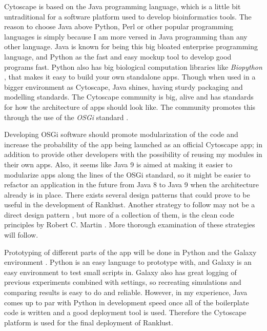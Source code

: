 \documentclass[UKenglish]{ifimaster}
\begin{document}
Cytoscape is based on the Java programming language, which is a little bit untraditional for a software platform used to
develop bioinformatics tools. %
The reason to choose Java above Python, Perl or other popular programming languages is simply because I am more
versed in Java programming than any other language. Java is known for being this big bloated 
enterprise programming language, and Python as the fast and easy mockup tool to develop good programs fast. Python also
has big biological computation libraries like \emph{Biopython} \cite{biopython}, that makes it easy to build your own
standalone apps. Though when used in a bigger environment as Cytoscape, Java shines, having sturdy packaging and
modelling standards. The Cytoscape community is big, alive and has standards for how the architecture of apps should
look like. The community promotes this through the use of the \emph{OSGi} standard \cite{cytoscape-osgi}.

Developing OSGi software should promote modularization \cite{modularization} %
of the code and increase the probability of the app being launched as an official Cytoscape app; in addition to provide
other developers with the possibility of reusing my modules in their own apps. Also, it seems like Java 9 is aimed
at making it easier to modularize apps along the lines of the OSGi standard, so it might be easier to refactor an
application in the future from Java 8 to Java 9 when the architecture already is in place. There exists several design 
patterns that could prove to be useful in the development of Ranklust. Another strategy to follow may not be a direct 
design pattern \cite{designpattern}, but more of a collection of them, is the clean code principles by Robert C. Martin
\cite{cleancode}. More thorough examination of these strategies will follow.

Prototyping of different parts of the app will be done in Python and the Galaxy environment \cite{galaxy}. Python is an
easy language to prototype with, and Galaxy is an easy environment to test small scripts in. Galaxy also has great
logging of previous experiments combined with settings, so recreating simulations and comparing results is easy to do and
reliable. However, in my experience, Java comes up to par with Python in development speed once all of the boilerplate
code is written and a good deployment tool is used. Therefore the Cytoscape platform is used for the final deployment of
Ranklust.
\end{document}
